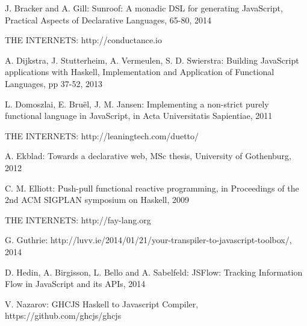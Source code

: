 \documentclass[preprint]{sigplanconf}
\begin{document}



\begin{thebibliography}{}
\softraggedright

J. Bracker and A. Gill: Sunroof: A monadic DSL for generating JavaScript, Practical Aspects of Declarative Languages, 65-80, 2014

THE INTERNETS: http://conductance.io

A. Dijkstra, J. Stutterheim, A. Vermeulen, S. D. Swierstra: Building JavaScript applications with Haskell, Implementation and Application of Functional Languages, pp 37-52, 2013

L. Domoszlai, E. Bruël, J. M. Jansen: Implementing a non-strict purely functional language in JavaScript, in Acta Universitatis Sapientiae, 2011

THE INTERNETS: http://leaningtech.com/duetto/

A. Ekblad: Towards a declarative web, MSc thesis, University of Gothenburg, 2012

C. M. Elliott: Push-pull functional reactive programming, in Proceedings of the 2nd ACM SIGPLAN symposium on Haskell, 2009

THE INTERNETS: http://fay-lang.org

G. Guthrie: http://luvv.ie/2014/01/21/your-transpiler-to-javascript-toolbox/, 2014

D. Hedin, A. Birgisson, L. Bello and A. Sabelfeld: JSFlow: Tracking Information Flow in JavaScript and its APIs, 2014

V. Nazarov: GHCJS Haskell to Javascript Compiler, https://github.com/ghcjs/ghcjs

\end{thebibliography}
\end{document}
